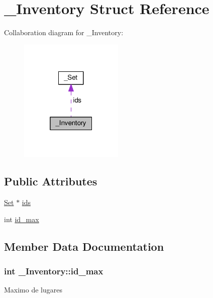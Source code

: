 \hypertarget{struct__Inventory}{}\section{\+\_\+\+Inventory Struct Reference}
\label{struct__Inventory}


Collaboration diagram for \+\_\+\+Inventory\+:\nopagebreak
\begin{figure}[H]
\begin{center}
\leavevmode
\includegraphics[width=140pt]{struct__Inventory__coll__graph}
\end{center}
\end{figure}
\subsection*{Public Attributes}
\begin{DoxyCompactItemize}
\item 
\hyperlink{set_8h_a6d3b7f7c92cbb4577ef3ef7ddbf93161}{Set} $\ast$ \hyperlink{struct__Inventory_a7f6b5d7d1111e7e8f8999c656ae27d0c}{ids}
\item 
int \hyperlink{struct__Inventory_a4b104bc26c8e030cae3032cbe7d940a3}{id\+\_\+max}
\end{DoxyCompactItemize}


\subsection{Member Data Documentation}
\subsubsection[{\texorpdfstring{id\+\_\+max}{id_max}}]{\setlength{\rightskip}{0pt plus 5cm}int \+\_\+\+Inventory\+::id\+\_\+max}\hypertarget{struct__Inventory_a4b104bc26c8e030cae3032cbe7d940a3}{}\label{struct__Inventory_a4b104bc26c8e030cae3032cbe7d940a3}
Maximo de lugares 
